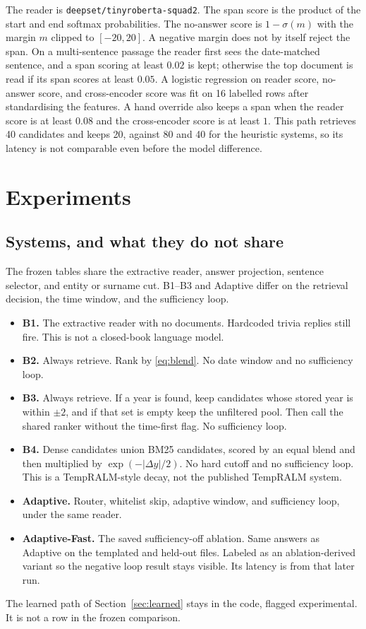 \documentclass[11pt]{article}
\begin{document}
The reader is \texttt{deepset/tinyroberta-squad2}.
The span score is the product of the start and end softmax probabilities.
The no-answer score is $1-\sigma(m)$ with the margin $m$ clipped to $[-20,20]$.
A negative margin does not by itself reject the span.
On a multi-sentence passage the reader first sees the date-matched sentence, and a span scoring at least $0.02$ is kept; otherwise the top document is read if its span scores at least $0.05$.
A logistic regression on reader score, no-answer score, and cross-encoder score was fit on 16 labelled rows after standardising the features.
A hand override also keeps a span when the reader score is at least $0.08$ and the cross-encoder score is at least $1$.
This path retrieves 40 candidates and keeps 20, against 80 and 40 for the heuristic systems, so its latency is not comparable even before the model difference.

\section{Experiments}
\label{sec:exp}

\subsection{Systems, and what they do not share}

The frozen tables share the extractive reader, answer projection, sentence selector, and entity or surname cut.
B1--B3 and Adaptive differ on the retrieval decision, the time window, and the sufficiency loop.
\begin{itemize}[leftmargin=1.4em]
  \item \textbf{B1.} The extractive reader with no documents. Hardcoded trivia replies still fire. This is not a closed-book language model.
  \item \textbf{B2.} Always retrieve. Rank by \eqref{eq:blend}. No date window and no sufficiency loop.
  \item \textbf{B3.} Always retrieve. If a year is found, keep candidates whose stored year is within $\pm 2$, and if that set is empty keep the unfiltered pool. Then call the shared ranker without the time-first flag. No sufficiency loop.
  \item \textbf{B4.} Dense candidates union BM25 candidates, scored by an equal blend and then multiplied by $\exp(-|\Delta y|/2)$. No hard cutoff and no sufficiency loop. This is a TempRALM-style decay, not the published TempRALM system.
  \item \textbf{Adaptive.} Router, whitelist skip, adaptive window, and sufficiency loop, under the same reader.
  \item \textbf{Adaptive-Fast.} The saved sufficiency-off ablation. Same answers as Adaptive on the templated and held-out files. Labeled as an ablation-derived variant so the negative loop result stays visible. Its latency is from that later run.
\end{itemize}
The learned path of Section~\ref{sec:learned} stays in the code, flagged experimental.
It is not a row in the frozen comparison.
\end{document}
